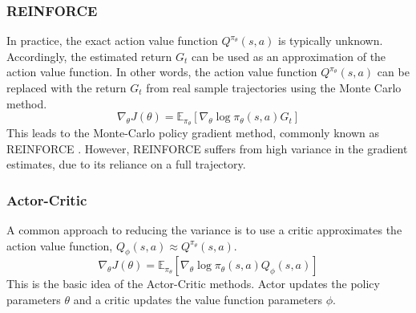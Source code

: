 \subsubsection{REINFORCE}

In practice, the exact action value function $Q^{\pi_\theta} (s, a)$ is typically unknown.
Accordingly, the estimated return $G_t$ can be used as an approximation of the action value function.
In other words, the action value function $Q^{\pi_\theta} (s, a)$ can be replaced with the return $G_t$ from real sample trajectories using the Monte Carlo method.
\begin{equation}
  \nabla_\theta J(\theta) = \mathbb{E}_{\pi_\theta}[\nabla_\theta \log \pi_\theta(s, a) G_t]
\end{equation}
This leads to the Monte-Carlo policy gradient method, commonly known as REINFORCE \cite{REINFORCE}.
However, REINFORCE suffers from high variance in the gradient estimates, due to its reliance on a full trajectory.

\subsubsection{Actor-Critic}

A common approach to reducing the variance is to use a critic approximates the action value function, $Q_\phi(s, a) \approx Q^{\pi_\theta}(s, a)$.
\begin{equation}
  \nabla_\theta J(\theta) = \mathbb{E}_{\pi_\theta} [\nabla_\theta \log \pi_\theta(s, a) Q_\phi(s, a)]
\end{equation}
This is the basic idea of the Actor-Critic methods.
Actor updates the policy parameters $\theta$ and a critic updates the value function parameters $\phi$.

